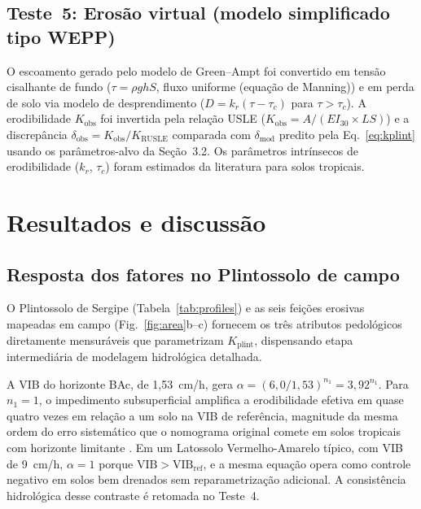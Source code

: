 \documentclass[preprint,review,12pt,authoryear]{elsarticle}
\begin{document}
\subsection{Teste~5: Erosão virtual (modelo simplificado tipo WEPP)}

O escoamento gerado pelo modelo de Green--Ampt foi convertido em tensão cisalhante de fundo ($\tau = \rho g h S$, fluxo uniforme (equação de Manning)) e em perda de solo via modelo de desprendimento ($D = k_r(\tau - \tau_c)$ para $\tau > \tau_c$). A erodibilidade $K_{\mathrm{obs}}$ foi invertida pela relação USLE ($K_{\mathrm{obs}} = A/(EI_{30} \times LS)$) e a discrepância $\delta_{\mathrm{obs}} = K_{\mathrm{obs}}/K_{\mathrm{RUSLE}}$ comparada com $\delta_{\mathrm{mod}}$ predito pela Eq.~\ref{eq:kplint} usando os parâmetros-alvo da Seção~3.2. Os parâmetros intrínsecos de erodibilidade ($k_r$, $\tau_c$) foram estimados da literatura para solos tropicais.

\section{Resultados e discussão}
\label{sec:results}

\subsection{Resposta dos fatores no Plintossolo de campo}

O Plintossolo de Sergipe (Tabela~\ref{tab:profiles}) e as seis feições erosivas mapeadas em campo (Fig.~\ref{fig:area}b--c) fornecem os três atributos pedológicos diretamente mensuráveis que parametrizam $K_{\mathrm{plint}}$, dispensando etapa intermediária de modelagem hidrológica detalhada.

A VIB do horizonte BAc, de 1,53~cm/h, gera $\alpha = (6{,}0/1{,}53)^{n_1} = 3{,}92^{n_1}$. Para $n_1 = 1$, o impedimento subsuperficial amplifica a erodibilidade efetiva em quase quatro vezes em relação a um solo na VIB de referência, magnitude da mesma ordem do erro sistemático que o nomograma original comete em solos tropicais com horizonte limitante \citep{alewell_et_al_2019}. Em um Latossolo Vermelho-Amarelo típico, com VIB de 9~cm/h, $\alpha = 1$ porque $\mathrm{VIB} > \mathrm{VIB_{ref}}$, e a mesma equação opera como controle negativo em solos bem drenados sem reparametrização adicional. A consistência hidrológica desse contraste é retomada no Teste~4.
\end{document}
